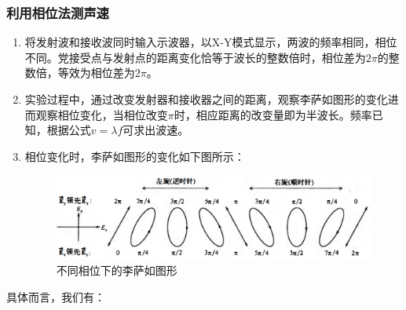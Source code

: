 \documentclass[UTF8]{article}
\theoremstyle{MyLineTheoremStyle} %
\theoremstyle{MyBlockTheoremStyle} %
\theoremstyle{MySubsubsectionStyle} %
\begin{document}
\subsubsection{利用相位法测声速}
\begin{enumerate}
\item 将发射波和接收波同时输入示波器，以X-Y模式显示，两波的频率相同，相位不同。党接受点与发射点的距离变化恰等于波长的整数倍时，相位差为$ 2\pi $的整数倍，等效为相位差为$ 2\pi $。
\item 实验过程中，通过改变发射器和接收器之间的距离，观察李萨如图形的变化进而观察相位变化，当相位改变$ \pi $时，相应距离的改变量即为半波长。频率已知，根据公式$ v=\lambda f $可求出波速。
\item 相位变化时，李萨如图形的变化如下图所示：
\begin{figure}[H]\centering
    \includegraphics[width=0.8\columnwidth]{assets/5.5/5.1 主轴为 y.png}
    \caption{不同相位下的李萨如图形}
\end{figure}
\end{enumerate}
具体而言，我们有：
\end{document}
